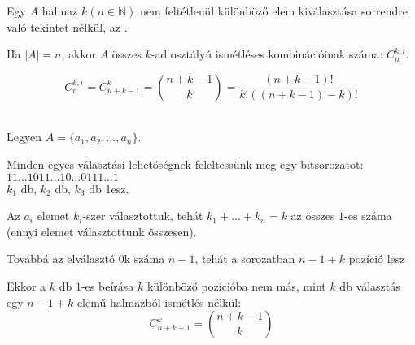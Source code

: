 \begin{frame}
  \begin{tcolorbox}[title={Def.: Ismétléses Kombináció}]
    Egy $A$ halmaz $k (n \in \mathbb{N})$ nem feltétlenül különböző elem kiválasztása sorrendre való tekintet nélkül, az .\\
    \msmallskip
    
    Ha $|A| = n$, akkor $A$ összes $k$-ad osztályú ismétléses kombinációinak száma: $C_n^{k, i}$.
  \end{tcolorbox}

  \begin{tcolorbox}[title={Tétel: Ismétléses kombinációk száma}]
    $$C_n^{k, i} = C_{n + k -1}^k = {{n + k - 1}\choose{k}} = \frac{(n + k - 1)!}{k!((n + k - 1) - k)!}$$
  \tcblower
    \\
    \mmedskip

    Legyen $A = \{a_1, a_2, ..., a_n\}$.\\
    \msmallskip
    
    Minden egyes választási lehetőségnek feleltessünk meg egy bitsorozatot:\\
    $1 1 ... 1 0 1 1 ... 1 0 ... 0 1 1 1 ... 1$\\
    $k_1$ db,    $k_2$ db,         $k_3$ db 1esz.\\
    \msmallskip
    
    Az $a_i$ elemet $k_i$-szer választottuk, tehát $k_1 + ... + k_n = k$ az összes $1$-es száma (ennyi elemet választottunk összesen).\\
    \msmallskip
    
    Továbbá az elválasztó $0$k száma $n - 1$, tehát a sorozatban $n - 1 + k$ pozíció lesz\\
    \mmedskip

    Ekkor a $k$ db $1$-es beírása $k$ különböző pozícióba nem más, mint $k$ db választás egy $n - 1 + k$ elemű halmazból ismétlés nélkül:\\
    $$C_{n + k - 1}^k = {n + k - 1 \choose k}$$
  \end{tcolorbox}
\end{frame}

